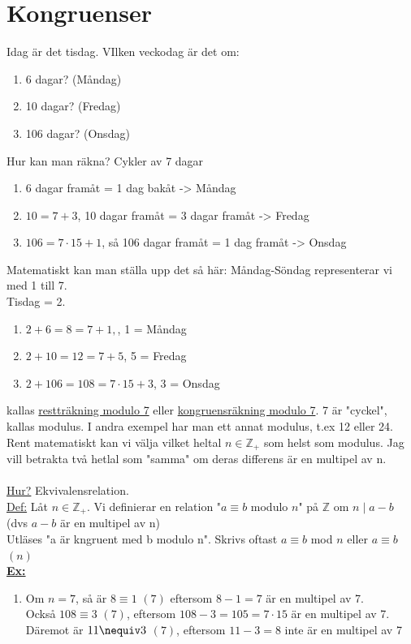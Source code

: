 \documentclass{article}
\begin{document}
    \section{Kongruenser}
    Idag är det tisdag. VIlken veckodag är det om:
    \begin{enumerate}
        \item 6 dagar? (Måndag)
        \item 10 dagar? (Fredag)
        \item 106 dagar? (Onsdag)
    \end{enumerate}
    Hur kan man räkna? Cykler av 7 dagar
    \begin{enumerate}
        \item $6$ dagar framåt = 1 dag bakåt -> Måndag
        \item $10=7+3$, 10 dagar framåt = 3 dagar framåt -> Fredag
        \item $106=7\cdot 15+1$, så 106 dagar framåt = 1 dag framåt -> Onsdag
    \end{enumerate}
    Matematiskt kan man ställa upp det så här:
    \indent Måndag-Söndag representerar vi med 1 till 7.\\
    \indent Tisdag = 2.
    \begin{enumerate}
        \item $2+6=8=7+1,$, 1 = Måndag
        \item $2+10=12=7+5$, 5 = Fredag
        \item $2+106=108=7\cdot 15+3$, 3 = Onsdag
    \end{enumerate}
    kallas \underline{restträkning modulo 7} eller \underline{kongruensräkning modulo 7}. 
    7 är "cyckel", kallas modulus.
    I andra exempel har man ett annat modulus, t.ex 12 eller 24.\\
    Rent matematiskt kan vi välja vilket heltal $n\in \mathbb{Z_{+}}$ som helst som modulus.
    Jag vill betrakta två hetlal som "samma" om deras differens är en multipel av n.\\\\
    \underline{Hur?} Ekvivalensrelation.\\
    \underline{Def:} Låt $n\in \mathbb{Z_{+}}$. 
    Vi definierar en relation "$a\equiv b$ modulo $n$" på $\mathbb{Z}$ om $n\mid a-b$ (dvs $a-b$ är en multipel av n)\\
    Utläses "a är kngruent med b modulo n". Skrivs oftast $a\equiv b$ mod $n$ eller $a\equiv b$ $(n)$\\
    \underline{\textbf{Ex:}}
    \begin{enumerate}
        \item Om $n=7$, så är $8\equiv 1$ $(7)$ eftersom $8-1=7$ är en multipel av 7.\\
            Också $108\equiv 3$ $(7)$, eftersom $108-3=105=7\cdot 15$ är en multipel av 7.
            Däremot är $11\/\nequiv 3$ $(7)$, eftersom $11-3=8$ inte är en multipel av 7
    \end{enumerate}
\end{document}
